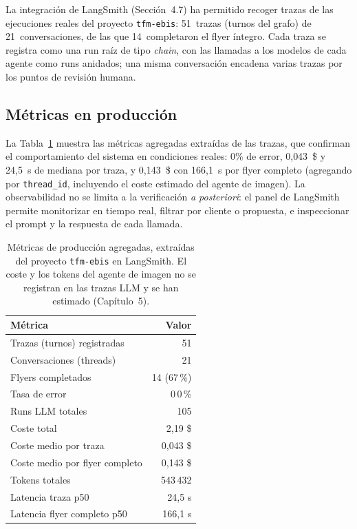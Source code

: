 La integración de LangSmith (Sección~4.7) ha permitido recoger trazas de las ejecuciones reales del proyecto \texttt{tfm-ebis}: 51~trazas (turnos del grafo) de 21~conversaciones, de las que 14~completaron el flyer íntegro. Cada traza se registra como una run raíz de tipo \textit{chain}, con las llamadas a los modelos de cada agente como runs anidados; una misma conversación encadena varias trazas por los puntos de revisión humana.

\subsection{Métricas en producción}
La Tabla~\ref{tab:prod-metrics} muestra las métricas agregadas extraídas de las trazas, que confirman el comportamiento del sistema en condiciones reales: 0\% de error, 0{,}043~\$ y 24{,}5~s de mediana por traza, y 0{,}143~\$ con 166{,}1~s por flyer completo (agregando por \texttt{thread\_id}, incluyendo el coste estimado del agente de imagen). La observabilidad no se limita a la verificación \textit{a posteriori}: el panel de LangSmith permite monitorizar en tiempo real, filtrar por cliente o propuesta, e inspeccionar el prompt y la respuesta de cada llamada.

\begin{table}[htbp]
\centering
\fontsize{10}{12}\selectfont
\begin{tabular}{lr}
\toprule
Métrica & Valor \\
\midrule
Trazas (turnos) registradas & 51 \\
Conversaciones (threads) & 21 \\
Flyers completados & 14 (67\,\%) \\
Tasa de error & 0\,0\,\% \\
Runs LLM totales & 105 \\
Coste total & 2{,}19 \$ \\
Coste medio por traza & 0{,}043 \$ \\
Coste medio por flyer completo & 0{,}143 \$ \\
Tokens totales & 543\,432 \\
Latencia traza p50 & 24{,}5 s \\
Latencia flyer completo p50 & 166{,}1 s \\
\bottomrule
\end{tabular}
\caption{Métricas de producción agregadas, extraídas del proyecto \texttt{tfm-ebis} en LangSmith. El coste y los tokens del agente de imagen no se registran en las trazas LLM y se han estimado (Capítulo~5).}
\label{tab:prod-metrics}
\end{table}

